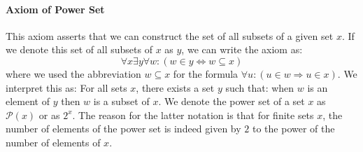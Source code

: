 

% 

\paragraph{Axiom of Power Set}
This axiom asserts that we can construct the set of all subsets of a given set $x$. If we denote this set of all subsets of $x$ as $y$, we can write the axiom as:
\begin{equation}
\forall x \exists y \forall w: (w \in y \Leftrightarrow w \subseteq x)
\end{equation}
where we used the abbreviation $w \subseteq x$ for the formula $\forall u: (u \in w \Rightarrow u \in x)$. We interpret this as: For all sets $x$, there exists a set $y$ such that: when $w$ is an element of $y$ then $w$ is a subset of $x$. We denote the power set of a set $x$ as $\mathcal{P}(x)$ or as $2^x$. The reason for the latter notation is that for finite sets $x$, the number of elements of the power set is indeed given by $2$ to the power of the number of elements of $x$.



